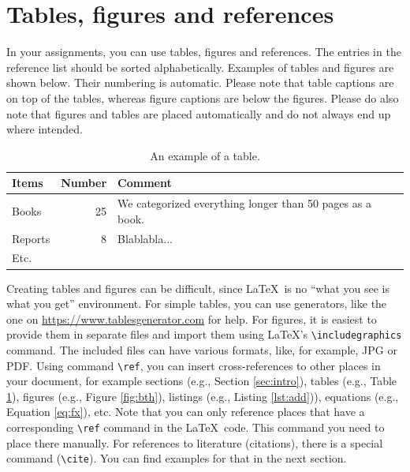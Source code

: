 \documentclass[12pt,a4paper]{article}
\begin{document}
\section{Tables, figures and references}
\label{sec:tab}
In your assignments, you can use tables, figures and references. The entries in the reference list should be sorted alphabetically. Examples of tables and figures are shown below. Their numbering is automatic. Please note that table captions are on top of the tables, whereas figure captions are below the figures.
Please do also note that figures and tables are placed automatically and do not always end up where intended.

\begin{table}[bth]
\centering
\caption{An example of a table.}
\label{tab:ex}
\begin{tabular}{|l|r|p{6cm}|}
\hline
\textbf{Items} & \textbf{Number} & \textbf{Comment} \\
\hline
Books & 25 & We categorized everything longer than 50 pages as a book. \\
\hline
Reports & 8 & Blablabla... \\ 
\hline
Etc. & & \\
\hline 
\end{tabular}
\end{table}

Creating tables and figures can be difficult, since \LaTeX\ is no ``what you see is what you get'' environment. For simple tables, you can use generators, like the one on \url{https://www.tablesgenerator.com} for help. For figures, it is easiest to provide them in separate files and import them using \LaTeX's \texttt{\textbackslash includegraphics} command. The included files can have various formats, like, for example, JPG or PDF.
Using command \texttt{\textbackslash ref}, you can insert cross-references to other places in your document, for example sections (e.g., Section \ref{sec:intro}), tables (e.g., Table \ref{tab:ex}), figures (e.g., Figure \ref{fig:bth}), listings (e.g., Listing \ref{lst:add})), equations (e.g., Equation \ref{eq:fx}), etc. Note that you can only reference places that have a corresponding \texttt{\textbackslash ref} command in the \LaTeX\ code. This command you need to place there manually. For references to literature (citations), there is a special command (\texttt{\textbackslash cite}). You can find examples for that in the next section.
\end{document}
